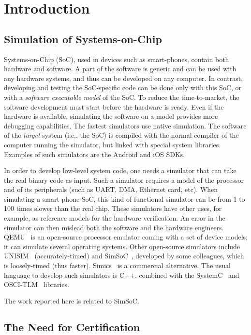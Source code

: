 \section{Introduction}
\label{sec:intro}

\subsection{Simulation of Systems-on-Chip}

Systems-on-Chip (SoC), used in devices such as smart-phones, contain both
hardware and software. A part of the software is generic and can be used with
any hardware systems, and thus can be developed on any computer. In contrast,
developing and testing the SoC-specific code can be done only with this SoC, or
with a \emph{software executable model} of the SoC. 
To reduce the time-to-market, the software development must start
before the hardware is ready. Even if the hardware is available,
simulating the software on a model provides more debugging
capabilities.
%
The %
fastest simulators use native simulation.
%
The software of the \emph{target} system (i.e., the SoC) is compiled with
the normal compiler of the computer running the simulator, 
but linked with special system
libraries. Examples of such simulators are the Android and iOS
SDKs.

In order to develop low-level system code, one needs a simulator that
can take the real binary code as input. Such a simulator requires a
model of the processor and of its peripherals (such as UART, DMA,
Ethernet card, etc). When simulating a smart-phone SoC, this kind of
functional simulator can be from 1 to 100 times slower than the real
chip.
%
These simulators have other uses, for example, as
reference models for the hardware verification.
An error in the simulator can then mislead both the software and the hardware
engineers.
QEMU~\cite{qemu} is an open-source processor emulator
coming with a set of device models; it can simulate several
operating systems. Other open-source simulators include
UNISIM~\cite{unisim} (accurately-timed)
and
SimSoC~\cite{ossc09}, developed by some colleagues, %
which is loosely-timed (thus faster).
Simics~\cite{simics} is a commercial alternative.
%
The usual language to develop such simulators is C++, combined with
the SystemC~\cite{systemc-lrm} and OSCI-TLM~\cite{tlm-osci}
libraries.

\medskip
The work reported here is related to SimSoC.

\subsection{The Need for Certification}

